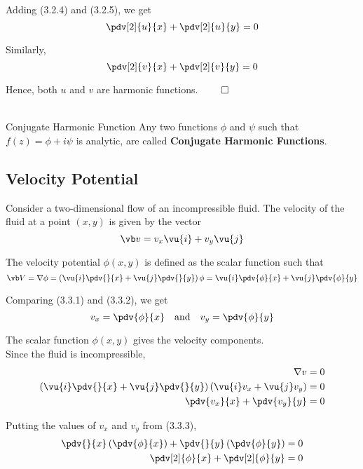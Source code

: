 Adding (3.2.4) and (3.2.5), we get
\begin{equation}
    \pdv[2]{u}{x} + \pdv[2]{u}{y} = 0
\end{equation}

Similarly,
\begin{equation}
    \pdv[2]{v}{x} + \pdv[2]{v}{y} = 0
\end{equation}

Hence, both $u$ and $v$ are harmonic functions. \hfill $\qed$ \\~\\

\begin{definition}{Conjugate Harmonic Function}{}
    Any two functions $\phi$ and $\psi$ such that $f(z) = \phi + i\psi$ is analytic, are called \textbf{Conjugate Harmonic Functions}.
\end{definition}


\subsection{Velocity Potential}
Consider a two-dimensional flow of an incompressible fluid. The velocity of the fluid at a point $(x,y)$ is given by the vector
\begin{equation}
    \vb v = v_x \vu{i} + v_y \vu{j}
\end{equation}

The velocity potential $\phi(x,y)$ is defined as the scalar function such that
\begin{equation}
    \vb V = \nabla \phi = \left( \vu{i} \pdv{}{x} + \vu{j} \pdv{}{y} \right) \phi = \vu{i} \pdv{\phi}{x} + \vu{j} \pdv{\phi}{y}
\end{equation}

Comparing (3.3.1) and (3.3.2), we get
\begin{equation}
    v_x = \pdv{\phi}{x} \quad \text{and} \quad v_y = \pdv{\phi}{y}
\end{equation}

The scalar function $\phi(x,y)$ gives the velocity components. \\
Since the fluid is incompressible,
\begin{align*}
    \nabla v &= 0 \\
    \left( \vu{i} \pdv{}{x} + \vu{j} \pdv{}{y} \right) \left( \vu{i} v_x + \vu{j} v_y \right) &= 0 \\
    \pdv{v_x}{x} + \pdv{v_y}{y} &= 0
\end{align*}

Putting the values of $v_x$ and $v_y$ from (3.3.3),
\begin{align*}
    \pdv{}{x} \left( \pdv{\phi}{x} \right) + \pdv{}{y} \left( \pdv{\phi}{y} \right) &= 0 \\
    \pdv[2]{\phi}{x} + \pdv[2]{\phi}{y} &= 0
\end{align*}

